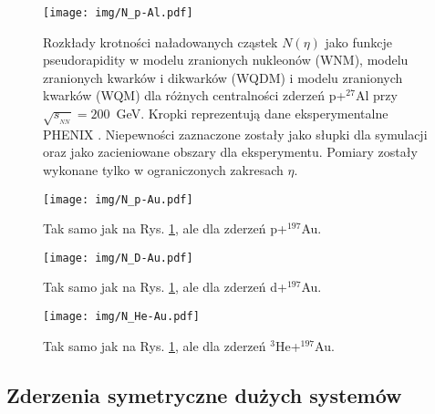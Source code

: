 \documentclass[a4paper,12pt]{article}
\begin{document}
\begin{figure}[H]
\begin{center}
\texttt{[image: img/N\_p-Al.pdf]}
\caption{Rozkłady krotności naładowanych cząstek $N(\eta)$ jako funkcje pseudorapidity w modelu zranionych nukleonów (WNM), modelu zranionych kwarków i dikwarków (WQDM) i modelu zranionych kwarków (WQM) dla różnych centralności zderzeń p+$^{27}$Al przy $\sqrt{s_{_{NN}}}=200$~GeV. Kropki reprezentują dane eksperymentalne PHENIX \cite{Adare:2018toe}. Niepewności zaznaczone zostały jako słupki dla symulacji oraz jako zacieniowane obszary dla eksperymentu. Pomiary zostały wykonane tylko w ograniczonych zakresach $\eta$.\label{fig:p-Al} }
\end{center}
\end{figure}
\begin{figure}[H]
\begin{center}
\texttt{[image: img/N\_p-Au.pdf]}
\caption{Tak samo jak na Rys. \ref{fig:p-Al}, ale dla zderzeń p+$^{197}$Au.\label{fig:p-Au}}
\end{center}
\end{figure}
\begin{figure}[H]
\begin{center}
\texttt{[image: img/N\_D-Au.pdf]}
\caption{Tak samo jak na Rys. \ref{fig:p-Al}, ale dla zderzeń d+$^{197}$Au.\label{fig:d-Au}}
\end{center}
\end{figure}
\vspace{2em}
\begin{figure}[H]
\begin{center}
\texttt{[image: img/N\_He-Au.pdf]}
\caption{Tak samo jak na Rys. \ref{fig:p-Al}, ale dla zderzeń $^3$He+$^{197}$Au.\label{fig:He-Au}}
\end{center}
\end{figure}


\subsection{Zderzenia symetryczne dużych systemów}
\end{document}
